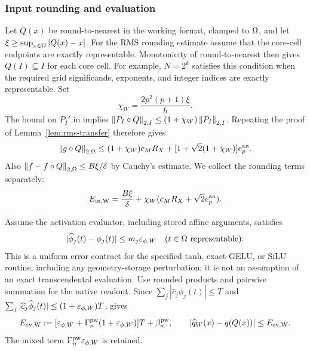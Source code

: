 \subsubsection{Input rounding and evaluation}
Let $Q(x)$ be round-to-nearest in the working format, clamped to $\Omega$, and
let $\xi\ge\sup_{x\in\Omega}|Q(x)-x|$. For the RMS rounding estimate assume
that the core-cell endpoints are exactly representable. Monotonicity of
round-to-nearest then gives $Q(I)\subseteq I$ for each core cell. For example, $N=2^k$ satisfies this condition when the required grid
significands, exponents, and integer indices are exactly representable.
Set
\begin{equation}
 \chi_W=\frac{2p^2(p+1)\xi}h.
 \label{eq:chi}
\end{equation}
The bound on $P_I'$ in  implies
$\left\lVert P_I\circ Q\right\rVert_{2,I}\le(1+\chi_W)\left\lVert P_I\right\rVert_{2,I}$.
Repeating the proof of Lemma~\ref{lem:rms-transfer} therefore gives
\begin{equation}
 \left\lVert g\circ Q\right\rVert_{2,\Omega}
 \le(1+\chi_W)c_M R_X+
       [1+\sqrt2(1+\chi_W)]e_p^{\rm an}.
 \label{eq:gQ}
\end{equation}
Also $\left\lVert f-f\circ Q\right\rVert_{2,\Omega}\le B\xi/\delta$ by Cauchy's estimate.
We collect the rounding terms separately:
\begin{equation}
 E_{\rm in,W}=\frac{B\xi}\delta+
        \chi_W(c_M R_X+\sqrt2 e_p^{\rm an}).
 \label{eq:input-round-target}
\end{equation}

Assume the activation evaluator, including stored affine arguments, satisfies
\[
 |\widehat\phi_j(t)-\phi_j(t)|\le m_j\varepsilon_{\phi,W}
 \quad(t\in\Omega\text{ representable}).
\]
This is a uniform error contract for the specified tanh, exact-GELU, or SiLU
routine, including any geometry-storage perturbation; it is not an assumption
of an exact transcendental evaluation. Use rounded products and pairwise
summation for the native readout. Since
$\sum_j|\widehat c_j\phi_j(t)|\le T$ and
$\sum_j|\widehat c_j\widehat\phi_j(t)|\le(1+\varepsilon_{\phi,W})T$,
 gives
\begin{equation}
 E_{\rm ev,W}:=
 [\varepsilon_{\phi,W}+\Gamma_n^{\rm pw}(1+\varepsilon_{\phi,W})]T+\beta_n^{\rm pw},
 \qquad
 |\widehat q_W(x)-q(Q(x))|\le E_{\rm ev,W}.
 \label{eq:evaluation}
\end{equation}
The mixed term $\Gamma_n^{\rm pw}\varepsilon_{\phi,W}$ is retained.

